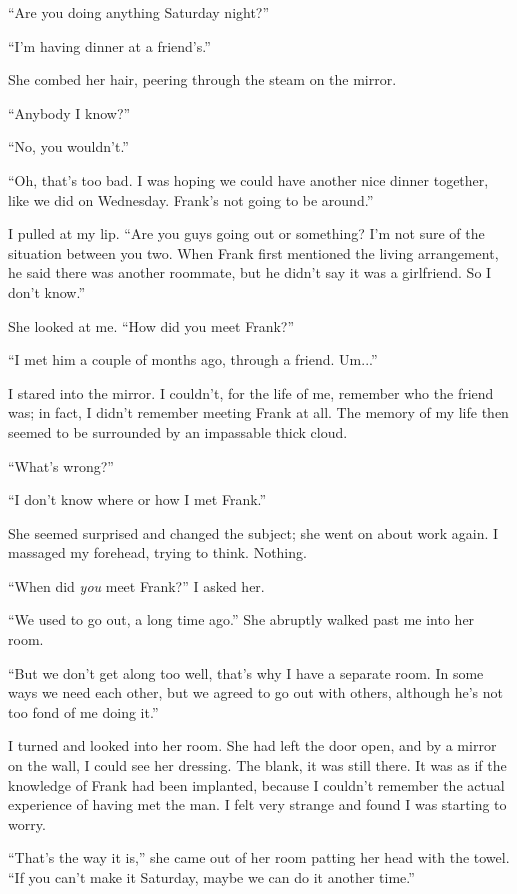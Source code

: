 \documentclass[
]{article}
\begin{document}
``Are you doing anything Saturday night?''

``I'm having dinner at a friend's.''

She combed her hair, peering through the steam on the mirror.

``Anybody I know?''

``No, you wouldn't.''

``Oh, that's too bad. I was hoping we could have another nice dinner
together, like we did on Wednesday. Frank's not going to be around.''

I pulled at my lip. ``Are you guys going out or something? I'm not sure
of the situation between you two. When Frank first mentioned the living
arrangement, he said there was another roommate, but he didn't say it
was a girlfriend. So I don't know.''

She looked at me. ``How did you meet Frank?''

``I met him a couple of months ago, through a friend. Um...''

I stared into the mirror. I couldn't, for the life of me, remember who
the friend was; in fact, I didn't remember meeting Frank at all. The
memory of my life then seemed to be surrounded by an impassable thick
cloud.

``What's wrong?''

``I don't know where or how I met Frank.''

She seemed surprised and changed the subject; she went on about work
again. I massaged my forehead, trying to think. Nothing.

``When did \emph{you} meet Frank?'' I asked her.

``We used to go out, a long time ago.'' She abruptly walked past me into
her room.

``But we don't get along too well, that's why I have a separate room. In
some ways we need each other, but we agreed to go out with others,
although he's not too fond of me doing it.''

I turned and looked into her room. She had left the door open, and by a
mirror on the wall, I could see her dressing. The blank, it was still
there. It was as if the knowledge of Frank had been implanted, because I
couldn't remember the actual experience of having met the man. I felt
very strange and found I was starting to worry.

``That's the way it is,'' she came out of her room patting her head with
the towel. ``If you can't make it Saturday, maybe we can do it another
time.''
\end{document}
